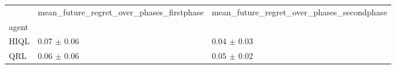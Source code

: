 \begin{tabular}{lll}
\toprule
 & mean_future_regret_over_phases_firstphase & mean_future_regret_over_phases_secondphase \\
agent &  &  \\
\midrule
HIQL & 0.07 $\pm$ 0.06 & 0.04 $\pm$ 0.03 \\
QRL & 0.06 $\pm$ 0.06 & 0.05 $\pm$ 0.02 \\
\bottomrule
\end{tabular}
